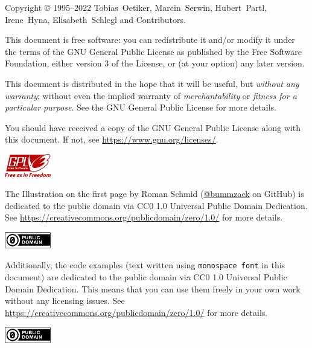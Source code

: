 \begin{small}
  \noindent Copyright \copyright{} 1995--2022 Tobias~Oetiker, Marcin~Serwin,
  Hubert~Partl, Irene~Hyna, Elisabeth~Schlegl and Contributors.

  This document is free software: you can redistribute it and/or modify it under
  the terms of the GNU General Public License as published by the Free Software
  Foundation, either version 3 of the License, or (at your option) any later
  version.

  This document is distributed in the hope that it will be useful, but
  \emph{without any warranty}; without even the implied warranty of
  \emph{merchantability} or \emph{fitness for a particular purpose}.  See
  the GNU General Public License for more details.

  You should have received a copy of the GNU General Public License along with
  this document.  If not, see \url{https://www.gnu.org/licenses/}.
  \vspace{-5pt}
  \begin{flushright}
    \href{https://www.gnu.org/licenses/gpl-3.0.html}{%
      \includegraphics[width=2cm]{images/gpl3.pdf}}\hspace*{10pt}
  \end{flushright}

  \bigskip\noindent The Illustration on the first page by Roman Schmid
  (\href{https://github.com/bummzack}{@bummzack} on GitHub) is dedicated to the
  public domain via CC0 1.0 Universal Public Domain Dedication. See
  \url{https://creativecommons.org/publicdomain/zero/1.0/} for more details.
  \vspace{-15pt}
  \begin{flushright}
    \href{https://creativecommons.org/publicdomain/zero/1.0/}{%
      \includegraphics[width=2cm]{images/cc-zero.pdf}}\hspace*{10pt}
  \end{flushright}

  \bigskip\noindent
  Additionally, the code examples (text written using \texttt{monospace font}
  in this document) are dedicated to the public domain via CC0 1.0 Universal
  Public Domain Dedication. This means that you can use them freely in your own
  work without any licensing issues. See
  \url{https://creativecommons.org/publicdomain/zero/1.0/} for more details.
  \vspace{-15pt}
  \begin{flushright}
    \href{https://creativecommons.org/publicdomain/zero/1.0/}{%
      \includegraphics[width=2cm]{images/cc-zero.pdf}}\hspace*{10pt}
  \end{flushright}


\end{small}
